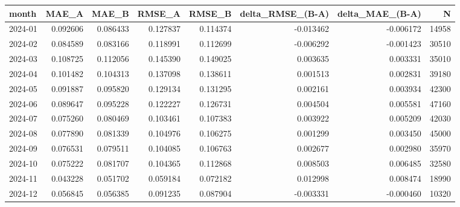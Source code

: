 \begin{tabular}{lrrrrrrr}
\toprule
month & MAE_A & MAE_B & RMSE_A & RMSE_B & delta_RMSE_(B-A) & delta_MAE_(B-A) & N \\
\midrule
2024-01 & 0.092606 & 0.086433 & 0.127837 & 0.114374 & -0.013462 & -0.006172 & 14958 \\
2024-02 & 0.084589 & 0.083166 & 0.118991 & 0.112699 & -0.006292 & -0.001423 & 30510 \\
2024-03 & 0.108725 & 0.112056 & 0.145390 & 0.149025 & 0.003635 & 0.003331 & 35010 \\
2024-04 & 0.101482 & 0.104313 & 0.137098 & 0.138611 & 0.001513 & 0.002831 & 39180 \\
2024-05 & 0.091887 & 0.095820 & 0.129134 & 0.131295 & 0.002161 & 0.003934 & 42300 \\
2024-06 & 0.089647 & 0.095228 & 0.122227 & 0.126731 & 0.004504 & 0.005581 & 47160 \\
2024-07 & 0.075260 & 0.080469 & 0.103461 & 0.107383 & 0.003922 & 0.005209 & 42030 \\
2024-08 & 0.077890 & 0.081339 & 0.104976 & 0.106275 & 0.001299 & 0.003450 & 45000 \\
2024-09 & 0.076531 & 0.079511 & 0.104085 & 0.106763 & 0.002677 & 0.002980 & 35970 \\
2024-10 & 0.075222 & 0.081707 & 0.104365 & 0.112868 & 0.008503 & 0.006485 & 32580 \\
2024-11 & 0.043228 & 0.051702 & 0.059184 & 0.072182 & 0.012998 & 0.008474 & 18990 \\
2024-12 & 0.056845 & 0.056385 & 0.091235 & 0.087904 & -0.003331 & -0.000460 & 10320 \\
\bottomrule
\end{tabular}
